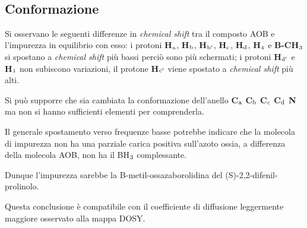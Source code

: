 \documentclass[a4paper, italian, oneside, 12pt]{article}
\begin{document}
\begin{figure}
\\
\vspace{-15pt}
\end{figure}

\subsection{Conformazione}
Si osservano le seguenti differenze in {\emph{chemical shift}} tra il composto AOB e l'impurezza in equilibrio con esso: i protoni {\bf{H$_{\textrm a}$}}, {\bf{H$_{\textrm b}$}}, {\bf{H$_{\textrm b'}$}}, {\bf{H$_{\textrm c}$}}, {\bf{H$_{\textrm d}$}}, {\bf{H$_{\textrm 4}$}} e {\bf{B-CH$_{\textrm 3}$}} si spostano a {\emph{chemical shift}} più bassi perciò sono più schermati; i protoni {\bf{H$_{\textrm d'}$}} e {\bf{H$_{\textrm 1}$}} non subiscono variazioni, il protone {\bf{H$_{\textrm c'}$}} viene spostato a {\emph{chemical shift}} più alti. 

Si può supporre che sia cambiata la conformazione dell'anello {\bf{C$_{\textrm a}$}} {\bf{C$_{\textrm b}$}} {\bf{C$_{\textrm c}$}} {\bf{C$_{\textrm d}$}} {\bf{N}} ma non si hanno sufficienti elementi per comprenderla.

Il generale spostamento verso frequenze basse potrebbe indicare che la molecola di impurezza non ha una parziale carica positiva sull'azoto ossia, a differenza della molecola AOB, non ha il BH$_{\textrm 3}$ complessante.

Dunque l'impurezza sarebbe la B-metil-ossazaborolidina del (S)-2,2-difenil-prolinolo.

Questa conclusione è compatibile con il coefficiente di diffusione leggermente maggiore osservato alla mappa DOSY.
\end{document}
